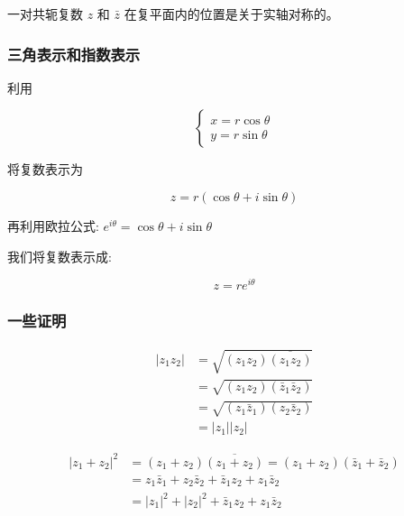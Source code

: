 一对共轭复数 \(z\) 和 \(\bar{z}\) 在复平面内的位置是关于实轴对称的。
\subsubsection{三角表示和指数表示}
\label{三角表示和指数表示}
利用

\begin{equation*}
\begin{cases}
x = r\cos\theta\\
y = r\sin\theta
\end{cases}
\end{equation*}

将复数表示为

\begin{equation*}
z=r(\cos\theta+i\sin\theta)\tag{三角表示}
\end{equation*}

再利用欧拉公式: \(e^{i\theta}=\cos\theta+i\sin\theta\)

我们将复数表示成:

\begin{equation*}
z=re^{i\theta}\tag{指数表示}
\end{equation*}
\subsubsection{一些证明}
\label{一些证明}
\begin{equation*}
\begin{aligned}
|z_1z_2|&=\sqrt{(z_1z_2)\overline{(z_1z_2)}}\\
&=\sqrt{(z_1z_2)(\bar{z}_1\bar{z}_2)}\\
&=\sqrt{(z_1\bar{z}_1)(z_2\bar{z}_2)}\\
&=|z_1||z_2|
\end{aligned}
\end{equation*}

\begin{equation*}
\begin{aligned}
\left|z_{1}+z_{2}\right|^{2} &=\left(z_{1}+z_{2}\right)\overline{\left(z_{1}+z_{2}\right)}=\left(z_{1}+z_{2}\right)\left(\bar{z}_{1}+\bar{z}_{2}\right)\\
&=z_{1}\bar{z}_{1}+z_{2}\bar{z}_{2}+\bar{z}_{1} z_{2}+z_{1}\bar{z}_{2}\\
&=\left|z_{1}\right|^{2}+\left|z_{2}\right|^{2}+\bar{z}_{1} z_{2}+z_{1}\bar{z}_{2}
\end{aligned}
\end{equation*}

